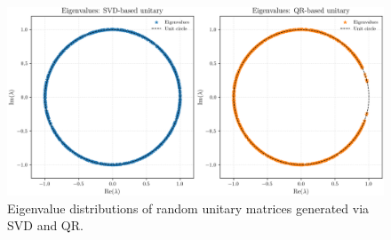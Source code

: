 \begin{figure}[htb]
    \centering
    \includegraphics[width=1\textwidth]{Graphics/eigenvalue_comparison.png}
    \caption{Eigenvalue distributions of random unitary matrices generated via SVD and QR.}
    \label{fig:eigenvalue-comparison}
\end{figure}